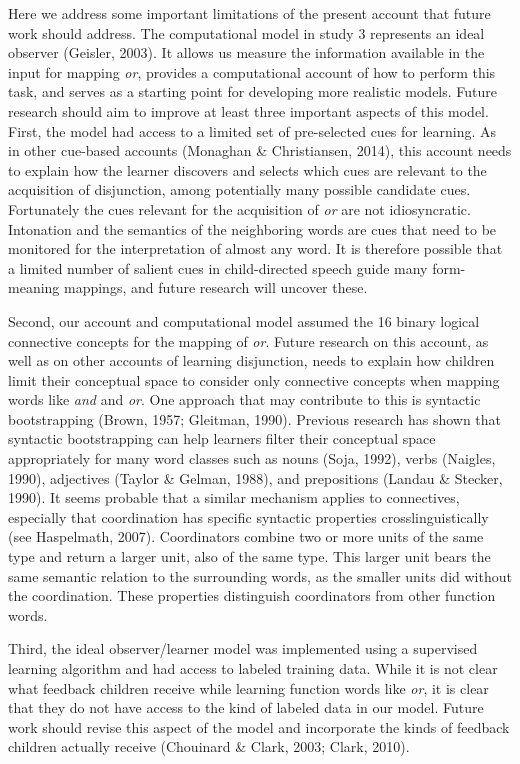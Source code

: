 \documentclass[
  ,man,floatsintext]{apa6}
\begin{document}
Here we address some important limitations of the present account that future work should address. The computational model in study 3 represents an ideal observer (Geisler, 2003). It allows us measure the information available in the input for mapping \emph{or}, provides a computational account of how to perform this task, and serves as a starting point for developing more realistic models. Future research should aim to improve at least three important aspects of this model. First, the model had access to a limited set of pre-selected cues for learning. As in other cue-based accounts (Monaghan \& Christiansen, 2014), this account needs to explain how the learner discovers and selects which cues are relevant to the acquisition of disjunction, among potentially many possible candidate cues. Fortunately the cues relevant for the acquisition of \emph{or} are not idiosyncratic. Intonation and the semantics of the neighboring words are cues that need to be monitored for the interpretation of almost any word. It is therefore possible that a limited number of salient cues in child-directed speech guide many form-meaning mappings, and future research will uncover these.

Second, our account and computational model assumed the 16 binary logical connective concepts for the mapping of \emph{or}. Future research on this account, as well as on other accounts of learning disjunction, needs to explain how children limit their conceptual space to consider only connective concepts when mapping words like \emph{and} and \emph{or}. One approach that may contribute to this is syntactic bootstrapping (Brown, 1957; Gleitman, 1990). Previous research has shown that syntactic bootstrapping can help learners filter their conceptual space appropriately for many word classes such as nouns (Soja, 1992), verbs (Naigles, 1990), adjectives (Taylor \& Gelman, 1988), and prepositions (Landau \& Stecker, 1990). It seems probable that a similar mechanism applies to connectives, especially that coordination has specific syntactic properties crosslinguistically (see Haspelmath, 2007). Coordinators combine two or more units of the same type and return a larger unit, also of the same type. This larger unit bears the same semantic relation to the surrounding words, as the smaller units did without the coordination. These properties distinguish coordinators from other function words.

Third, the ideal observer/learner model was implemented using a supervised learning algorithm and had access to labeled training data. While it is not clear what feedback children receive while learning function words like \emph{or}, it is clear that they do not have access to the kind of labeled data in our model. Future work should revise this aspect of the model and incorporate the kinds of feedback children actually receive (Chouinard \& Clark, 2003; Clark, 2010).
\end{document}
